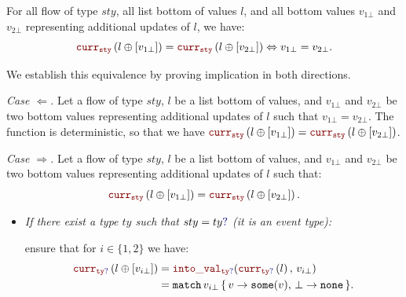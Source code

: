 \begin{lemma}
    \label{lem:semantics:grfrp:theorems:oversampling:CurrVal:last}
    For all flow of type $sty$, all list bottom of values $l$, and all bottom values $v_{1\bot}$ and
    $v_{2\bot}$ representing additional updates of $l$, we have:
    \begin{equation*}
        \CurrVal{sty}{l \lstconcat [v_{1\bot}]} = \CurrVal{sty}{l \lstconcat [v_{2\bot}]}
        \Leftrightarrow
        v_{1\bot} = v_{2\bot}.
    \end{equation*}
\end{lemma}
\begin{skippableproof}
    We establish this equivalence by proving implication in both directions.

    \noindent\textit{Case $\Leftarrow$.}
    Let a flow of type $sty$, $l$ be a list bottom of values, and $v_{1\bot}$ and $v_{2\bot}$ be two
    bottom values representing additional updates of $l$ such that $v_{1\bot} = v_{2\bot}$. The
    function  is deterministic, so that we have
    $\CurrVal{sty}{l \lstconcat [v_{1\bot}]} = \CurrVal{sty}{l \lstconcat [v_{2\bot}]}$.

    \noindent\textit{Case $\Rightarrow$.}
    Let a flow of type $sty$, $l$ be a list bottom of values, and $v_{1\bot}$ and $v_{2\bot}$ be two
    bottom values representing additional updates of $l$ such that:
    \begin{equation*}
        \CurrVal{sty}{l \lstconcat [v_{1\bot}]} = \CurrVal{sty}{l \lstconcat [v_{2\bot}]}.
    \end{equation*}

    \begin{itemize}
        \item \textit{If there exist a type $ty$ such that $sty = \mayB{ty}$
                  (\ie it is an event type):}

               ensure that for
              $i \in \{1,2\}$ we have:
              \begin{align*}
                  \CurrVal{\mayB{ty}}{l \lstconcat [v_{i\bot}]} & = \intoVal{\mayB{ty}}{\CurrVal{\mayB{ty}}{l}}{v_{i\bot}}                                     \\
                                                                & = \ttf{match} \, v_{i\bot} \, \{ \, v \rightarrow \some{v}, \, \bot \rightarrow \none \, \}.
              \end{align*}


\end{itemize}
\end{skippableproof}

